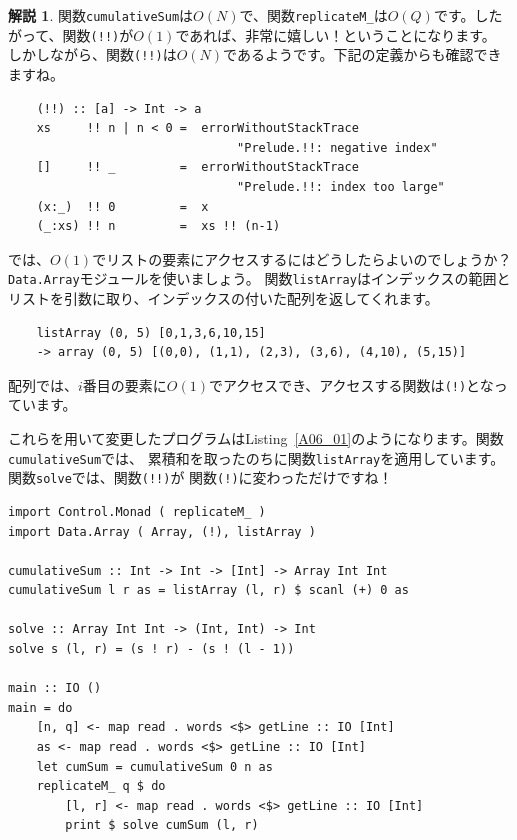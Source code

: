 \documentclass[12pt,a4paper,dvipdfmx,fleqn]{article}%
\theoremstyle{definition}
\theoremstyle{definition}
\newtheorem*{ans*}{解説}
\theoremstyle{definition}
\begin{document}
\begin{ans*}
    関数\texttt{cumulativeSum}は$O(N)$で、関数\texttt{replicateM\_}は$O(Q)$です。したがって、関数\texttt{(!!)}が$O(1)$であれば、非常に嬉しい！ということになります。
    しかしながら、関数\texttt{(!!)}は$O(N)$であるようです。下記の定義からも確認できますね。
    \begin{verbatim}
    (!!) :: [a] -> Int -> a
    xs     !! n | n < 0 =  errorWithoutStackTrace 
                                "Prelude.!!: negative index"
    []     !! _         =  errorWithoutStackTrace 
                                "Prelude.!!: index too large"
    (x:_)  !! 0         =  x
    (_:xs) !! n         =  xs !! (n-1)
    \end{verbatim}
    \vspace*{-4mm}
    では、$O(1)$でリストの要素にアクセスするにはどうしたらよいのでしょうか？ \texttt{Data.Array}モジュールを使いましょう。
    関数\texttt{listArray}はインデックスの範囲とリストを引数に取り、インデックスの付いた配列を返してくれます。
    \begin{verbatim}
    listArray (0, 5) [0,1,3,6,10,15]
    -> array (0, 5) [(0,0), (1,1), (2,3), (3,6), (4,10), (5,15)]
    \end{verbatim}
    \vspace*{-4mm}
    配列では、$i$番目の要素に$O(1)$でアクセスでき、アクセスする関数は\texttt{(!)}となっています。\par
    これらを用いて変更したプログラムはListing~\ref{A06_01}のようになります。関数\texttt{cumulativeSum}では、
    累積和を取ったのちに関数\texttt{listArray}を適用しています。関数\texttt{solve}では、関数\texttt{(!!)}が
    関数\texttt{(!)}に変わっただけですね！
\end{ans*}
\begin{lstlisting}[caption=A06\_01.hs,label=A06_01]
import Control.Monad ( replicateM_ )
import Data.Array ( Array, (!), listArray )

cumulativeSum :: Int -> Int -> [Int] -> Array Int Int
cumulativeSum l r as = listArray (l, r) $ scanl (+) 0 as

solve :: Array Int Int -> (Int, Int) -> Int
solve s (l, r) = (s ! r) - (s ! (l - 1))

main :: IO ()
main = do
    [n, q] <- map read . words <$> getLine :: IO [Int]
    as <- map read . words <$> getLine :: IO [Int]
    let cumSum = cumulativeSum 0 n as
    replicateM_ q $ do
        [l, r] <- map read . words <$> getLine :: IO [Int]
        print $ solve cumSum (l, r)
\end{lstlisting}
\end{document}
